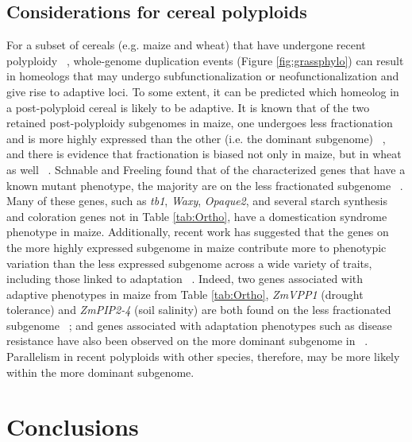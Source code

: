 \documentclass[12pt]{article}
\begin{document}
 \subsection*{Considerations for cereal polyploids}
For a subset of cereals (e.g. maize and wheat) that have undergone recent polyploidy ~\citep{Hughes2014, Pfeifer2014}, whole-genome duplication events (Figure \ref{fig:grassphylo}) can result in homeologs that may undergo subfunctionalization or neofunctionalization and give rise to adaptive loci.
To some extent, it can be predicted which homeolog in a post-polyploid cereal is likely to be adaptive.
It is known that of the two retained post-polyploidy subgenomes in maize, one undergoes less fractionation and is more highly expressed than the other (i.e. the dominant subgenome) ~\citep{Woodhouse2010, Schnable2011}, and there is evidence that fractionation is biased not only in maize, but in wheat as well ~\citep{Eckardt2014}.
Schnable and Freeling found that of the characterized genes that have a known mutant phenotype, the majority are on the less fractionated subgenome ~\citep{Schnable20112}.
Many of these genes, such as \textit{tb1}, \textit{Waxy}, \textit{Opaque2}, and several starch synthesis and coloration genes not in Table \ref{tab:Ortho}, have a domestication syndrome phenotype in maize.
Additionally, recent work has suggested that the genes on the more highly expressed subgenome in maize contribute more to phenotypic variation than the less expressed subgenome across a wide variety of traits, including those linked to adaptation ~\citep{RennyByfield2017}.
Indeed, two genes associated with adaptive phenotypes in maize from Table \ref{tab:Ortho}, \textit{ZmVPP1} (drought tolerance) and \textit{ZmPIP2-4} (soil salinity) are both found on the less fractionated subgenome ~\citep{Schnable20112}; and genes associated with adaptation phenotypes such as disease resistance have also been observed on the more dominant subgenome in ~\citep{RennyByfield2017}. 
Parallelism in recent polyploids with other species, therefore, may be more likely within the more dominant subgenome.

\section*{Conclusions}
\end{document}
